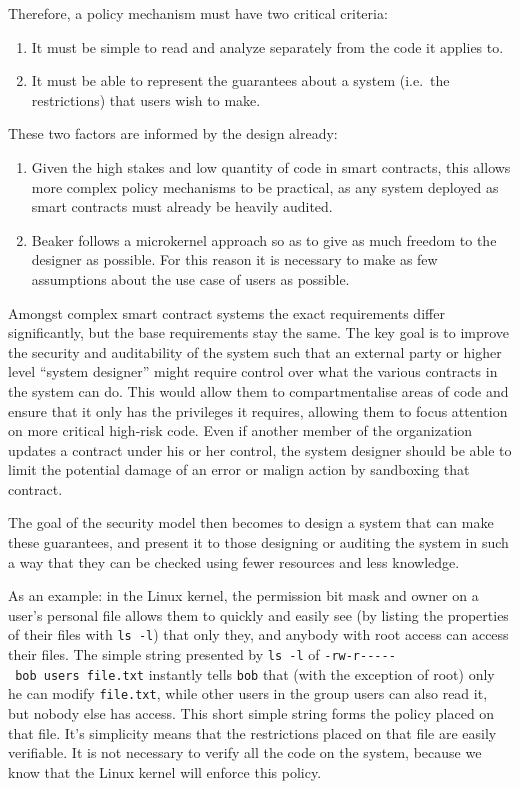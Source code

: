 \documentclass[english,a4paper]{article}
\begin{document}
Therefore, a policy mechanism must have two critical criteria:

\begin{enumerate}
\def\labelenumi{\arabic{enumi}.}
\item
  It must be simple to read and analyze separately from the code it
  applies to.
\item
  It must be able to represent the guarantees about a system (i.e.~the
  restrictions) that users wish to make.
\end{enumerate}

These two factors are informed by the design already:

\begin{enumerate}
\def\labelenumi{\arabic{enumi}.}
\item
  Given the high stakes and low quantity of code in smart contracts,
  this allows more complex policy mechanisms to be practical, as any
  system deployed as smart contracts must already be heavily audited.
\item
  Beaker follows a microkernel approach so as to give as much freedom to
  the designer as possible. For this reason it is necessary to make as
  few assumptions about the use case of users as possible.
\end{enumerate}

Amongst complex smart contract systems the exact requirements differ
significantly, but the base requirements stay the same. The key goal is
to improve the security and auditability of the system such that an
external party or higher level ``system designer'' might require control
over what the various contracts in the system can do. This would allow
them to compartmentalise areas of code and ensure that it only has the
privileges it requires, allowing them to focus attention on more
critical high-risk code. Even if another member of the organization
updates a contract under his or her control, the system designer should
be able to limit the potential damage of an error or malign action by
sandboxing that contract.

The goal of the security model then becomes to design a system that can
make these guarantees, and present it to those designing or auditing the
system in such a way that they can be checked using fewer resources and
less knowledge.

As an example: in the Linux kernel, the permission bit mask and owner on
a user's personal file allows them to quickly and easily see (by listing
the properties of their files with \texttt{ls\ -l}) that only they, and
anybody with root access can access their files. The simple string
presented by \texttt{ls\ -l} of
\texttt{-rw-r-\/-\/-\/-\/-\ bob\ users\ file.txt} instantly tells
\texttt{bob} that (with the exception of root) only he can modify
\texttt{file.txt}, while other users in the group users can also read
it, but nobody else has access. This short simple string forms the
policy placed on that file. It's simplicity means that the restrictions
placed on that file are easily verifiable. It is not necessary to verify
all the code on the system, because we know that the Linux kernel will
enforce this policy.
\end{document}
